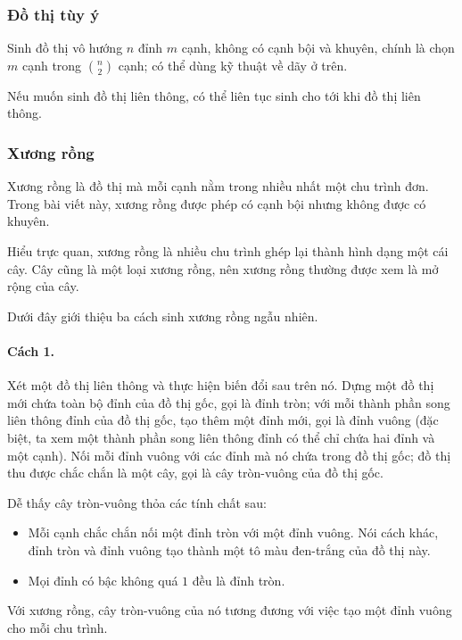 \documentclass[11pt]{article}
\begin{document}
\subsubsection{Đồ thị tùy ý}

Sinh đồ thị vô hướng $n$ đỉnh $m$ cạnh, không có cạnh bội và khuyên, chính là
chọn $m$ cạnh trong $\binom{n}{2}$ cạnh; có thể dùng kỹ thuật về dãy ở trên.

Nếu muốn sinh đồ thị liên thông, có thể liên tục sinh cho tới khi đồ thị liên
thông.

\subsubsection{Xương rồng}

Xương rồng là đồ thị mà mỗi cạnh nằm trong nhiều nhất một chu trình đơn. Trong
bài viết này, xương rồng được phép có cạnh bội nhưng không được có khuyên.

Hiểu trực quan, xương rồng là nhiều chu trình ghép lại thành hình dạng một cái
cây. Cây cũng là một loại xương rồng, nên xương rồng thường được xem là mở rộng
của cây.

Dưới đây giới thiệu ba cách sinh xương rồng ngẫu nhiên.

\paragraph{Cách 1.}
Xét một đồ thị liên thông và thực hiện biến đổi sau trên nó. Dựng một đồ thị
mới chứa toàn bộ đỉnh của đồ thị gốc, gọi là đỉnh tròn; với mỗi thành phần song
liên thông đỉnh của đồ thị gốc, tạo thêm một đỉnh mới, gọi là đỉnh vuông (đặc
biệt, ta xem một thành phần song liên thông đỉnh có thể chỉ chứa hai đỉnh và
một cạnh). Nối mỗi đỉnh vuông với các đỉnh mà nó chứa trong đồ thị gốc; đồ thị
thu được chắc chắn là một cây, gọi là cây tròn-vuông của đồ thị gốc.

Dễ thấy cây tròn-vuông thỏa các tính chất sau:

\begin{itemize}
  \item Mỗi cạnh chắc chắn nối một đỉnh tròn với một đỉnh vuông. Nói cách khác,
  đỉnh tròn và đỉnh vuông tạo thành một tô màu đen-trắng của đồ thị này.
  \item Mọi đỉnh có bậc không quá $1$ đều là đỉnh tròn.
\end{itemize}

Với xương rồng, cây tròn-vuông của nó tương đương với việc tạo một đỉnh vuông
cho mỗi chu trình.
\end{document}
